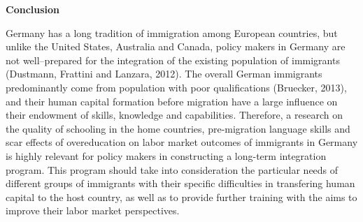 \documentclass[a4paper, 10pt]{article} %
\begin{document}
\vspace{10pt}

\textbf{Conclusion}

\vspace{10pt}

Germany has a long tradition of immigration among European countries, but unlike the United States, Australia and Canada, policy makers in Germany are not well--prepared for the integration of the existing population of immigrants (Dustmann, Frattini and Lanzara, 2012). The overall German immigrants predominantly come from population with poor qualifications (Bruecker, 2013), and their human capital formation before migration have a large influence on their endowment of skills, knowledge and capabilities. Therefore, a research on the quality of schooling in the home countries, pre-migration language skills and scar effects of overeducation on labor market outcomes of immigrants in Germany is highly relevant for policy makers in constructing a long-term integration program. This program should take into consideration the particular needs of different groups of immigrants with their specific difficulties in transfering human capital to the host country, as well as to provide further training with the aims to improve their labor market perspectives.



\end{document}
